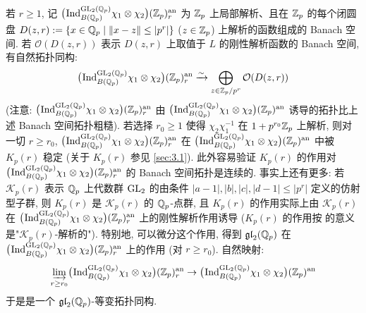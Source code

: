 若 $r \ge 1$, 记 $\bigl(\prescript{}{}{\mathrm{Ind}}_{B(\mathbb{Q}_p)}^{\mathrm{GL}_2(\mathbb{Q}_p)} \chi_1 \otimes \chi_2\bigr)(\mathbb{Z}_p)^{\mathrm{an}}_{r}$ 为 $\mathbb{Z}_p$ 上局部解析、且在 $\mathbb{Z}_p$ 的每个闭圆盘 $D(z,r) := \{x \in \mathbb{Q}_p \mid \|x-z\| \le |p^{r}|\}$ ($z \in \mathbb{Z}_p$) 上解析的函数组成的 Banach 空间.
若 $\mathcal{O}(D(z,r))$ 表示 $D(z,r)$ 上取值于 $L$ 的刚性解析函数的 Banach 空间, 有自然拓扑同构:
\[
\bigl(\prescript{}{}{\mathrm{Ind}}_{B(\mathbb{Q}_p)}^{\mathrm{GL}_2(\mathbb{Q}_p)} \chi_1 \otimes \chi_2\bigr)(\mathbb{Z}_p)^{\mathrm{an}}_{r}
\xrightarrow{\sim} \bigoplus_{z \in \mathbb{Z}_p/p^{r}} \mathcal{O}(D(z,r))
\]
(注意: $\bigl(\prescript{}{}{\mathrm{Ind}}_{B(\mathbb{Q}_p)}^{\mathrm{GL}_2(\mathbb{Q}_p)} \chi_1 \otimes \chi_2\bigr)(\mathbb{Z}_p)^{\mathrm{an}}_{r}$ 由 $\bigl(\prescript{}{}{\mathrm{Ind}}_{B(\mathbb{Q}_p)}^{\mathrm{GL}_2(\mathbb{Q}_p)} \chi_1 \otimes \chi_2\bigr)(\mathbb{Z}_p)^{\mathrm{an}}$ 诱导的拓扑比上述 Banach 空间拓扑粗糙).
若选择 $r_0 \ge 1$ 使得 $\chi_2\chi_1^{-1}$ 在 $1 + p^{r_0}\mathbb{Z}_p$ 上解析, 则对一切 $r \ge r_0$, $\bigl(\prescript{}{}{\mathrm{Ind}}_{B(\mathbb{Q}_p)}^{\mathrm{GL}_2(\mathbb{Q}_p)} \chi_1 \otimes \chi_2\bigr)(\mathbb{Z}_p)^{\mathrm{an}}_{r}$ 在 $\bigl(\prescript{}{}{\mathrm{Ind}}_{B(\mathbb{Q}_p)}^{\mathrm{GL}_2(\mathbb{Q}_p)} \chi_1 \otimes \chi_2\bigr)(\mathbb{Z}_p)^{\mathrm{an}}$ 中被 $K_p(r)$ 稳定 (关于 $K_p(r)$ 参见 \ref{sec:3.1}).
此外容易验证 $K_p(r)$ 的作用对 $\bigl(\prescript{}{}{\mathrm{Ind}}_{B(\mathbb{Q}_p)}^{\mathrm{GL}_2(\mathbb{Q}_p)} \chi_1 \otimes \chi_2\bigr)(\mathbb{Z}_p)^{\mathrm{an}}_{r}$ 的 Banach 空间拓扑是连续的.
事实上还有更多: 若 $\mathcal{K}_p(r)$ 表示 $\mathbb{Q}_p$ 上代数群 $\mathrm{GL}_2$ 的由条件 $|a-1|,|b|,|c|,|d-1| \le |p^{r}|$ 定义的仿射型子群, 则 $K_p(r)$ 是 $\mathcal{K}_p(r)$ 的 $\mathbb{Q}_p$-点群, 且 $K_p(r)$ 的作用实际上由 $\mathcal{K}_p(r)$ 在 $\bigl(\prescript{}{}{\mathrm{Ind}}_{B(\mathbb{Q}_p)}^{\mathrm{GL}_2(\mathbb{Q}_p)} \chi_1 \otimes \chi_2\bigr)(\mathbb{Z}_p)^{\mathrm{an}}_{r}$ 上的刚性解析作用诱导 ($K_p(r)$ 的作用按 \cite{ref:26} 的意义是"$\mathcal{K}_p(r)$-解析的").
特别地, 可以微分这个作用, 得到 $\mathfrak{gl}_2(\mathbb{Q}_p)$ 在 $\bigl(\prescript{}{}{\mathrm{Ind}}_{B(\mathbb{Q}_p)}^{\mathrm{GL}_2(\mathbb{Q}_p)} \chi_1 \otimes \chi_2\bigr)(\mathbb{Z}_p)^{\mathrm{an}}_{r}$ 上的作用 (对 $r \ge r_0$).
自然映射:
\begin{equation}
\label{eq:36}
\varinjlim_{r \ge r_0} \bigl(\prescript{}{}{\mathrm{Ind}}_{B(\mathbb{Q}_p)}^{\mathrm{GL}_2(\mathbb{Q}_p)} \chi_1 \otimes \chi_2\bigr)(\mathbb{Z}_p)^{\mathrm{an}}_{r}
\to \bigl(\prescript{}{}{\mathrm{Ind}}_{B(\mathbb{Q}_p)}^{\mathrm{GL}_2(\mathbb{Q}_p)} \chi_1 \otimes \chi_2\bigr)(\mathbb{Z}_p)^{\mathrm{an}}
\end{equation}
于是是一个 $\mathfrak{gl}_2(\mathbb{Q}_p)$-等变拓扑同构.

